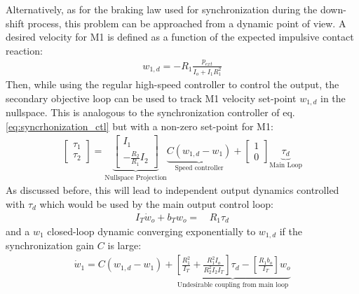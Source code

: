 %
Alternatively, as for the braking law used for synchronization during the down-shift process, this problem can be approached from a dynamic point of view. A desired velocity for M1 is defined as a function of the expected impulsive contact reaction:
%
\begin{align}
w_{1,d}  = - R_1 \frac{ p_{ext} }{I_o + I_1 R_1^2}
\end{align}
%
Then, while using the regular high-speed controller to control the output, the secondary objective loop can be used to track M1 velocity set-point $w_{1,d}$ in the nullspace. This is analogous to the synchronization controller of eq. \eqref{eq:syncrhonization_ctl} but with a non-zero set-point for M1:
%
\begin{align}
\left[ \begin{array}{c}
\tau_1 \\
\tau_2
\end{array} \right]
 = 
\underbrace{\left[ \begin{array}{c}
I_1 \\
-\frac{R_2 }{R_1} I_2 
\end{array} \right]}_{\text{Nullspace Projection}} \underbrace{C (w_{1,d} -  w_1)}_{\text{Speed controller}} + 
\left[ \begin{array}{c}
1 \\
0 
\end{array} \right]  \underbrace{ \tau_d }_{\text{Main Loop}}
\end{align}
%
As discussed before, this will lead to independent output dynamics controlled with $\tau_d$ which would be used by the main output control loop:
\begin{align}
I_T \dot{w}_o +
b_T  w_o
=& \, R_1 \tau_d  
\end{align}
and a $w_1$ closed-loop dynamic converging exponentially to $w_{1,d}$ if the synchronization gain $C$ is large:
\begin{align}
 \dot{w}_1 = C \left( w_{1,d} - w_1 \right) + \underbrace{\left[\frac{R_1^2}{I_T} + \frac{R_1^2 I_o}{R_2^2 I_2 I_T} \right] \tau_d - \left[\frac{R_1 b_o}{I_T}\right] w_o }_{\text{Undesirable coupling from main loop}}
\end{align}

